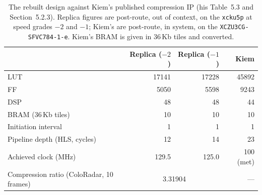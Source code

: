 \begin{table}[htbp]
\centering
\caption[The replica against Kiem's published design]{The rebuilt design against Kiem's published compression IP (his Table~5.3 and Section~5.2.3). Replica figures are post-route, out of context, on the \texttt{xcku5p} at speed grades $-2$ and $-1$; Kiem's are post-route, in system, on the \texttt{XCZU3CG-SFVC784-1-e}. Kiem's BRAM is given in 36\,Kb tiles and converted.}
\label{tab:replica}
\small
\begin{tabular}{@{}lrrr@{}}
\toprule
& Replica ($-2$) & Replica ($-1$) & Kiem \cite{kiem2025}\\
\midrule
LUT & \num{17141} & \num{17228} & \num{45892}\\
FF & \num{5050} & \num{5598} & \num{9243}\\
DSP & \num{48} & \num{48} & \num{44}\\
BRAM (36\,Kb tiles) & \num{10} & \num{10} & \num{10}\\
Initiation interval & \num{1} & \num{1} & 1\\
Pipeline depth (HLS, cycles) & \num{12} & \num{14} & 23\\
Achieved clock (MHz) & \num{129.5} & \num{125.0} & 100 (met)\\
Compression ratio (ColoRadar, 10 frames) & \multicolumn{2}{c}{\num{3.31904}} & ---\\
\bottomrule
\end{tabular}
\end{table}
